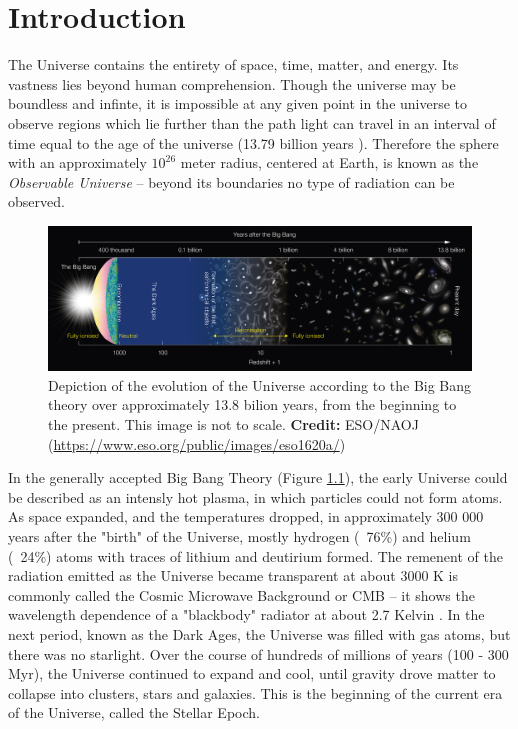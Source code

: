 \chapter{Introduction}
\label{intro}



The Universe contains the entirety of space, time, matter, and energy. Its vastness lies beyond human comprehension. Though the universe may be boundless and infinte, it is impossible at any given point in the universe to observe regions which lie further than the path light can travel in an interval of time equal to the age of the universe (13.79 billion years \citep{Singh2018}). Therefore the sphere with an approximately $10^{26}$ meter radius, centered at Earth, is known as the \emph{Observable Universe} \cite{Reese2005} -- beyond its boundaries no type of radiation can be observed. 

\begin{figure}[h]
	\includegraphics[width=\textwidth]{img/eso-big-bang}
	\caption[Planck History of the Universe]{Depiction of the evolution of the Universe according to the Big Bang theory over approximately 13.8 bilion years, from the beginning to the present. This image is not to scale. \textbf{Credit:} ESO/NAOJ (\url{https://www.eso.org/public/images/eso1620a/})}
	\label{fig:big-bang}
\end{figure} 

In the generally accepted Big Bang Theory (Figure \ref{fig:big-bang}), the early Universe could be described as an intensly hot plasma, in which particles could not form atoms. As space expanded, and the temperatures dropped, in approximately 300 000 years after the "birth" of the Universe, mostly hydrogen (~76\%) and helium (~24\%) atoms with traces of lithium and deutirium formed. The remenent of the radiation emitted as the Universe became transparent at about 3000 K is commonly called the Cosmic Microwave Background or CMB -- it shows the wavelength dependence of a "blackbody" radiator at about 2.7 Kelvin \citep{Fixsen2009}. In the next period, known as the Dark Ages, the Universe was filled with gas atoms, but there was no starlight. Over the course of hundreds of millions of years (100 - 300 Myr), the Universe continued to expand and cool, until gravity drove matter to collapse into clusters, stars and galaxies. This is the beginning of the current era of the Universe, called the Stellar Epoch.


